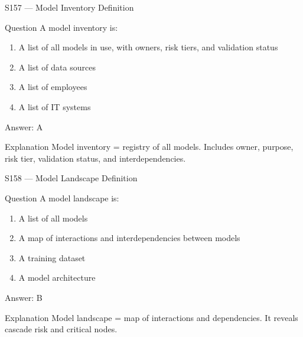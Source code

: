 \documentclass[aspectratio=169,8pt]{beamer}
\begin{document}
	\begin{frame}{S157 --- Model Inventory Definition}
		\begin{block}{Question}
			A model inventory is:
			\begin{enumerate}
				\item A list of all models in use, with owners, risk tiers, and validation status
				\item A list of data sources
				\item A list of employees
				\item A list of IT systems
			\end{enumerate}
		\end{block}
		\begin{exampleblock}{Answer: A}\end{exampleblock}
		\begin{block}{Explanation}
			Model inventory = registry of all models. Includes owner, purpose, risk tier, validation status, and interdependencies.
		\end{block}
	\end{frame}
	
	\begin{frame}{S158 --- Model Landscape Definition}
		\begin{block}{Question}
			A model landscape is:
			\begin{enumerate}
				\item A list of all models
				\item A map of interactions and interdependencies between models
				\item A training dataset
				\item A model architecture
			\end{enumerate}
		\end{block}
		\begin{exampleblock}{Answer: B}\end{exampleblock}
		\begin{block}{Explanation}
			Model landscape = map of interactions and dependencies. It reveals cascade risk and critical nodes.
		\end{block}
	\end{frame}
	
\end{document}
